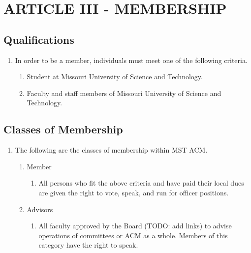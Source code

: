 
\section{ARTICLE III - MEMBERSHIP}
  \subsection{Qualifications}
    \begin{enumerate}[label=\alph*.]
      \item In order to be a member, individuals must meet one of the following
      criteria.
        \begin{enumerate}[label=\arabic*.]
          \item Student at Missouri University of Science and Technology.
          \item Faculty and staff members of Missouri University of Science and
          Technology.
        \end{enumerate}
    \end{enumerate}
  \subsection{Classes of Membership}
    \begin{enumerate}[label=\arabic*.]
      \item The following are the classes of membership within MST ACM.
        \begin{enumerate}[label=\alph*.]
          \item Member
            \begin{enumerate}[label=\arabic*.]
              \item All persons who fit the above criteria and have paid their
              local dues are given the right to vote, speak, and run for officer
              positions.
            \end{enumerate}
          \item Advisors
            \begin{enumerate}[label=\alph*.]
              \item All faculty approved by the Board (TODO: add links) to
              advise operations of committees or ACM as a whole. Members of this
              category have the right to speak.
            \end{enumerate}
        \end{enumerate}
    \end{enumerate}


